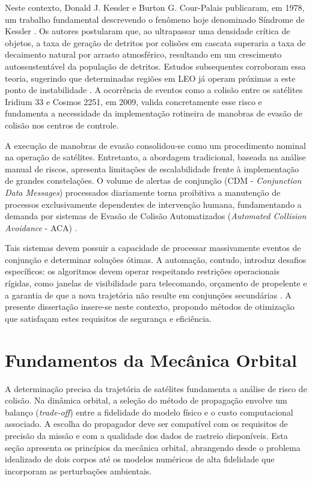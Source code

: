Neste contexto, Donald J. Kessler e Burton G. Cour-Palais publicaram, em 1978, um trabalho fundamental descrevendo o fenômeno hoje denominado Síndrome de Kessler \cite{Kessler1978}. Os autores postularam que, ao ultrapassar uma densidade crítica de objetos, a taxa de geração de detritos por colisões em cascata superaria a taxa de decaimento natural por arrasto atmosférico, resultando em um crescimento autossustentável da população de detritos. Estudos subsequentes corroboram essa teoria, sugerindo que determinadas regiões em LEO já operam próximas a este ponto de instabilidade \cite{Liou2010}. A ocorrência de eventos como a colisão entre os satélites Iridium 33 e Cosmos 2251, em 2009, valida concretamente esse risco e fundamenta a necessidade da implementação rotineira de manobras de evasão de colisão nos centros de controle.

A execução de manobras de evasão consolidou-se como um procedimento nominal na operação de satélites. Entretanto, a abordagem tradicional, baseada na análise manual de riscos, apresenta limitações de escalabilidade frente à implementação de grandes constelações. O volume de alertas de conjunção (CDM - \textit{Conjunction Data Messages}) processados diariamente torna proibitiva a manutenção de processos exclusivamente dependentes de intervenção humana, fundamentando a demanda por sistemas de Evasão de Colisão Automatizados (\textit{Automated Collision Avoidance} - ACA) \cite{Virgili2023}.

Tais sistemas devem possuir a capacidade de processar massivamente eventos de conjunção e determinar soluções ótimas. A automação, contudo, introduz desafios específicos: os algoritmos devem operar respeitando restrições operacionais rígidas, como janelas de visibilidade para telecomando, orçamento de propelente e a garantia de que a nova trajetória não resulte em conjunções secundárias \cite{Lemmens2022}. A presente dissertação insere-se neste contexto, propondo métodos de otimização que satisfaçam estes requisitos de segurança e eficiência.

\section{Fundamentos da Mecânica Orbital}
\label{sec:fundamentos_mecanica_orbital}

A determinação precisa da trajetória de satélites fundamenta a análise de risco de colisão. Na dinâmica orbital, a seleção do método de propagação envolve um balanço (\textit{trade-off}) entre a fidelidade do modelo físico e o custo computacional associado. A escolha do propagador deve ser compatível com os requisitos de precisão da missão e com a qualidade dos dados de rastreio disponíveis. Esta seção apresenta os princípios da mecânica orbital, abrangendo desde o problema idealizado de dois corpos até os modelos numéricos de alta fidelidade que incorporam as perturbações ambientais.

